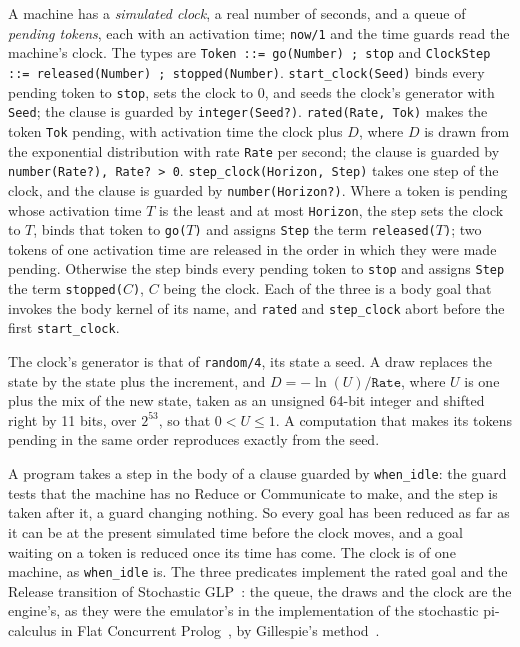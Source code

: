 A machine has a \emph{simulated clock}, a real number of seconds, and a queue of \emph{pending tokens}, each with an activation time; \verb|now/1| and the time guards read the machine's clock. The types are \verb|Token ::= go(Number) ; stop| and \verb|ClockStep ::= released(Number) ; stopped(Number)|. \verb|start_clock(Seed)| binds every pending token to \verb|stop|, sets the clock to 0, and seeds the clock's generator with \verb|Seed|; the clause is guarded by \verb|integer(Seed?)|. \verb|rated(Rate, Tok)| makes the token \verb|Tok| pending, with activation time the clock plus $D$, where $D$ is drawn from the exponential distribution with rate \verb|Rate| per second; the clause is guarded by \verb|number(Rate?), Rate? > 0|. \verb|step_clock(Horizon, Step)| takes one step of the clock, and the clause is guarded by \verb|number(Horizon?)|. Where a token is pending whose activation time $T$ is the least and at most \verb|Horizon|, the step sets the clock to $T$, binds that token to \verb|go(|$T$\verb|)| and assigns \verb|Step| the term \verb|released(|$T$\verb|)|; two tokens of one activation time are released in the order in which they were made pending. Otherwise the step binds every pending token to \verb|stop| and assigns \verb|Step| the term \verb|stopped(|$C$\verb|)|, $C$ being the clock. Each of the three is a body goal that invokes the body kernel of its name, and \verb|rated| and \verb|step_clock| abort before the first \verb|start_clock|.

The clock's generator is that of \verb|random/4|, its state a seed. A draw replaces the state by the state plus the increment, and $D = -\ln(U)/\mathtt{Rate}$, where $U$ is one plus the mix of the new state, taken as an unsigned 64-bit integer and shifted right by 11 bits, over $2^{53}$, so that $0 < U \le 1$. A computation that makes its tokens pending in the same order reproduces exactly from the seed.

A program takes a step in the body of a clause guarded by \verb|when_idle|: the guard tests that the machine has no Reduce or Communicate to make, and the step is taken after it, a guard changing nothing. So every goal has been reduced as far as it can be at the present simulated time before the clock moves, and a goal waiting on a token is reduced once its time has come. The clock is of one machine, as \verb|when_idle| is. The three predicates implement the rated goal and the Release transition of Stochastic GLP~\cite{shapiro2026sglp}: the queue, the draws and the clock are the engine's, as they were the emulator's in the implementation of the stochastic pi-calculus in Flat Concurrent Prolog~\cite{priami2001application}, by Gillespie's method~\cite{gillespie1977exact}.

